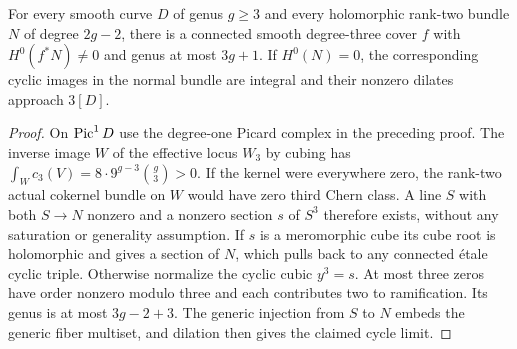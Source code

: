 \begin{corollary}\label{cor:any-triple}
For every smooth curve $D$ of genus $g\ge3$ and every holomorphic
rank-two bundle $N$ of degree $2g-2$, there is a connected smooth
degree-three cover $f$ with $H^0(f^*N)\ne0$ and genus at most $3g+1$.
If $H^0(N)=0$, the corresponding cyclic images in the normal bundle
are integral and their nonzero dilates approach $3[D]$.
\end{corollary}
\begin{proof}
On $\operatorname{Pic}^1D$ use the degree-one Picard complex in the preceding proof.
The inverse image $W$ of the effective locus $W_3$ by cubing has
$\int_Wc_3(V)=8\cdot9^{g-3}\binom g3>0$. If the kernel were
everywhere zero, the rank-two actual cokernel bundle on $W$ would
have zero third Chern class. A line $S$ with both $S\to N$ nonzero
and a nonzero section $s$ of $S^3$ therefore exists, without any
saturation or generality assumption. If $s$ is a meromorphic cube
its cube root is holomorphic and gives a section of $N$, which
pulls back to any connected \'etale cyclic triple. Otherwise normalize
the cyclic cubic $y^3=s$. At most three zeros have order nonzero
modulo three and each contributes two to ramification. Its genus
is at most $3g-2+3$. The generic injection from $S$ to $N$ embeds
the generic fiber multiset, and dilation then gives the claimed
cycle limit.
\end{proof}
